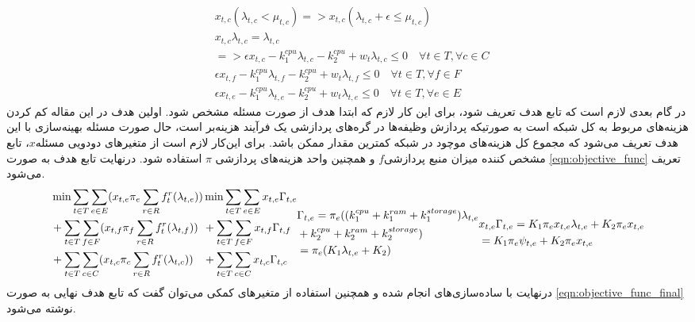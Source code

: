 	\begin{subequations}\label{eqn:queue_stability}
		\begin{align}
		&x_{t,c}(\lambda_{t,c} < \mu_{t,c}) => x_{t,c}(\lambda_{t,c} + \epsilon \le \mu_{t,c}) \\
		&x_{t,c}\lambda_{t,c} = \lambda_{t,c} \label{eqn:lambda_eqn}\\
		&=> \epsilon x_{t,c} - k_1^{cpu}\lambda_{t,c} - k_2^{cpu} + w_t\lambda_{t,c} \le 0 \quad \forall{t \in T}, \forall{c \in C} \\
		&\epsilon x_{t,f} - k_1^{cpu}\lambda_{t,f} - k_2^{cpu} + w_t\lambda_{t,f} \le 0 \quad \forall{t \in T}, \forall{f \in F} \\
		&\epsilon x_{t,e} - k_1^{cpu}\lambda_{t,e} - k_2^{cpu} + w_t\lambda_{t,e} \le 0 \quad \forall{t \in T}, \forall{e \in E}
		\end{align}
	\end{subequations}
	در گام بعدی لازم است که تابع هدف تعریف شود، برای این کار لازم که ابتدا هدف از صورت مسئله مشخص شود. اولین هدف در این مقاله کم کردن هزینه‌های مربوط به کل شبکه است به صورتیکه پردازش وظیفه‌ها در گره‌های پردازشی یک فرآیند هزینه‌بر است، حال صورت مسئله بهینه‌سازی با این هدف تعریف می‌شود که مجموع کل هزینه‌های موچود در شبکه کمترین مقدار ممکن باشد. برای این‌کار لازم است از متغیرهای دودویی مسئله$x$، تابع مشخص کننده میزان منبع پردازشی$f$ و همچنین واحد هزینه‌های پردازشی $\pi$ استفاده شود. درنهایت تابع هدف به صورت \cref{eqn:objective_func} تعریف می‌شود. 
	\begin{subequations}\label{eqn:objective_func}
		\begin{align}
		& \notag \min \sum_{t \in T}\sum_{e \in E} (x_{t,e}\pi_e\sum_{r \in R}f_t^r(\lambda_{t,e})) \\
		&\notag + \sum_{t \in T}\sum_{f \in F} (x_{t,f}\pi_f\sum_{r \in R}f_t^r(\lambda_{t,f})) \\
		& + \sum_{t \in T}\sum_{c \in C} (x_{t,c}\pi_c\sum_{r \in R}f_t^r(\lambda_{t,c}))
		\end{align}
		\begin{align}
		& \notag \min \sum_{t \in T}\sum_{e \in E} x_{t,e}\Gamma_{t,e} \\
		& \notag + \sum_{t \in T}\sum_{f \in F} x_{t,f}\Gamma_{t,f} \\
		& + \sum_{t \in T}\sum_{c \in C} x_{t,c}\Gamma_{t,c}
		\end{align}
		\begin{align}
		&\notag \Gamma_{t,e} = \pi_e((k_1^{cpu}+k_1^{ram}+k_1^{storage})\lambda_{t,e} \\
		&\notag +k_2^{cpu}+k_2^{ram}+k_2^{storage}) \\
		& = \pi_e(K_1\lambda_{t,e}+K_2)
		\end{align}
		\begin{align}
		&\notag x_{t,e}\Gamma_{t,e} = K_1\pi_ex_{t,e}\lambda_{t,e} + K_2\pi_ex_{t,e} \\
		&= K_1\pi_e\psi_{t,e} + K_2\pi_ex_{t,e}
		\end{align}
	\end{subequations}
	درنهایت با ساده‌سازی‌های انجام شده و همچنین استفاده از متغیرهای کمکی می‌توان گفت که تابع هدف نهایی به صورت \cref{eqn:objective_func_final} نوشته می‌شود. 
	

